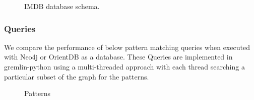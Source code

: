 \begin{figure}[t]
\centering
{}
\caption{IMDB database schema.}
\label{fig:schema}
\centering
\end{figure}

\subsubsection{Queries}

We compare the performance of below pattern matching queries when executed with Neo4j or OrientDB as a database. These Queries are implemented in gremlin-python using a multi-threaded approach with each thread searching a particular subset of the graph for the patterns. 


 \begin{figure}[t]
\centering
{}
\caption{Patterns}
\label{fig:query}
\centering
\end{figure} 

